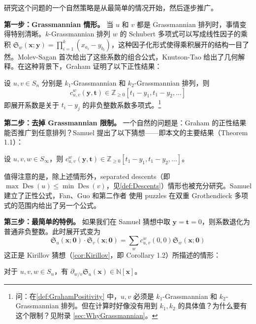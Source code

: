 研究这个问题的一个自然策略是从最简单的情况开始，然后逐步推广。

\textbf{第一步：Grassmannian 情形。}
当 $u$ 和 $v$ 都是 Grassmannian 排列时，事情变得特别清晰。$k$-Grassmannian 排列 $w$ 的 Schubert 多项式可以写成线性因子的乘积 $\mathfrak{S}_w(\mathbf{x}; \mathbf{y}) = \prod_{i=1}^{k}(x_{a_i} - y_{b_i})$，这种因子化形式使得乘积展开的结构一目了然。Molev-Sagan \cite{molevsagan1999} 首次给出了这些系数的组合公式，Knutson-Tao \cite{knutson2003} 给出了几何解释。在这种背景下，Graham \cite{Gr} 证明了以下正性结果：

\begin{Theorem}
\label{def:GrahamPositivity}
设 $u, v \in S_n$ 分别是 $k_1$-Grassmannian 和 $k_2$-Grassmannian 排列，则
$$c^w_{u,v}(\mathbf{y}, \mathbf{t}) \in \mathbb{Z}_{\geq 0}[t_1-y_1, t_1-y_2, \ldots]$$
即展开系数是关于 $t_i - y_j$ 的非负整数系数多项式。\footnote{问：在\cref{def:GrahamPositivity} 中，$u, v$ 必须是 $k_1$-Grassmannian 和 $k_2$-Grassmannian 排列。但在计算时好像没有用到 $k_1, k_2$ 的具体值？为什么要有这个限制？见附录 \cref{sec:WhyGrassmannian}。}
\end{Theorem}

\textbf{第二步：去掉 Grassmannian 限制。}
一个自然的问题是：Graham 的正性结果能否推广到任意排列？Samuel \cite{Sa} 提出了以下猜想——即本文的主要结果（Theorem 1.1）：

\begin{Theorem}
\label{conj:Samuel}
设 $u, v, w \in S_\infty$，则 $c^w_{u,v}(\mathbf{y}, \mathbf{t}) \in \mathbb{Z}_{\geq 0}[t_1-y_1, t_1-y_2, \ldots]$。
\end{Theorem}

值得注意的是，除上述情形外，separated descents（即 $\max \operatorname{Des}(u) \leq \min \operatorname{Des}(v)$，见\cref{def:Descents}）情形也被充分研究。Samuel \cite{Sa} 建立了正性公式，Fan、Guo 和第二作者 \cite{FGL2025} 使用 puzzles 在双重 Grothendieck 多项式的范围内给出了另一个公式。

\textbf{第三步：最简单的特例。}
如果我们在 Samuel 猜想中取 $\mathbf{y} = \mathbf{t} = 0$，则系数退化为普通非负整数。此时展开式变为
$$\mathfrak{S}_u(\mathbf{x}; \mathbf{0}) \cdot \mathfrak{S}_v(\mathbf{x}; \mathbf{0}) = \sum_w c^w_{u,v}(0, 0) \mathfrak{S}_w(\mathbf{x}; \mathbf{0})$$
这正是 Kirillov 猜想（\cref{cor:Kirillov}，即 Corollary 1.2）所描述的情形：

\begin{Corollary}
\label{cor:Kirillov}
对于 $u, v, w \in S_n$，有 $\partial_{w/v} \mathfrak{S}_u(\mathbf{x}) \in \mathbb{N}[\mathbf{x}]$。
\end{Corollary}

